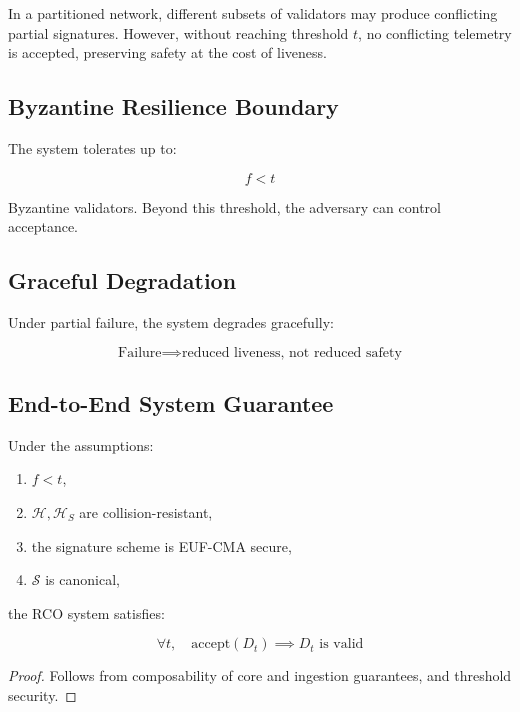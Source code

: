 In a partitioned network, different subsets of validators may produce conflicting partial signatures. However, without reaching threshold $t$, no conflicting telemetry is accepted, preserving safety at the cost of liveness.

\subsection{Byzantine Resilience Boundary}

The system tolerates up to:

\begin{equation}
f < t
\end{equation}

Byzantine validators. Beyond this threshold, the adversary can control acceptance.

\subsection{Graceful Degradation}

Under partial failure, the system degrades gracefully:

\begin{equation}
\text{Failure} \implies \text{reduced liveness, not reduced safety}
\end{equation}

\subsection{End-to-End System Guarantee}

\begin{theorem}
Under the assumptions:
\begin{enumerate}
\item $f < t$,
\item $\mathcal{H}, \mathcal{H}_S$ are collision-resistant,
\item the signature scheme is EUF-CMA secure,
\item $\mathcal{S}$ is canonical,
\end{enumerate}
the RCO system satisfies:

\[
\forall t, \quad \text{accept}(D_t) \implies D_t \text{ is valid}
\]
\end{theorem}

\begin{proof}
Follows from composability of core and ingestion guarantees, and threshold security.
\end{proof}

